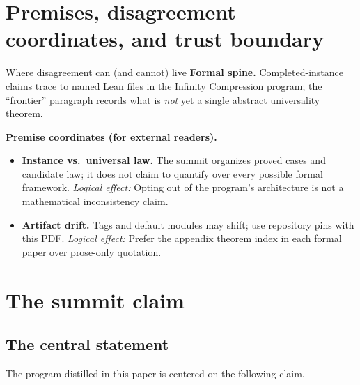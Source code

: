 \documentclass[11pt]{article}
\begin{document}

\section{Premises, disagreement coordinates, and trust boundary}\label{sec:premises-ic-summit}
\begin{keybox}{Where disagreement can (and cannot) live}
\textbf{Formal spine.}
Completed-instance claims trace to named Lean files in the Infinity Compression program; the ``frontier'' paragraph records what is \emph{not} yet a single abstract universality theorem.

\medskip
\textbf{Premise coordinates (for external readers).}
{\raggedright
\begin{itemize}[leftmargin=2em]
\item \textbf{Instance vs.\ universal law.} The summit organizes proved cases and candidate law; it does not claim to quantify over every possible formal framework.
  \emph{Logical effect:} Opting out of the program's architecture is not a mathematical inconsistency claim.
\item \textbf{Artifact drift.} Tags and default modules may shift; use repository pins with this PDF.
  \emph{Logical effect:} Prefer the appendix theorem index in each formal paper over prose-only quotation.
\end{itemize}
\par}
\end{keybox}

\tableofcontents
\newpage

\section{The summit claim}\label{sec:summit-claim}

\subsection{The central statement}

The program distilled in this paper is centered on the following claim.
\end{document}
